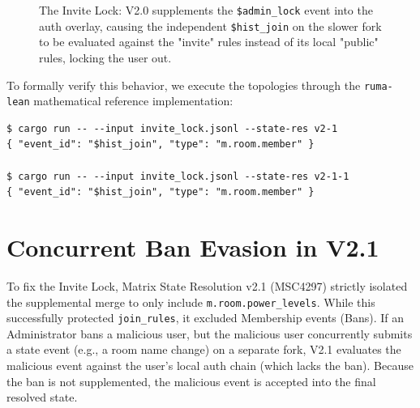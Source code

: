\documentclass[12pt]{article}
\begin{document}
\begin{figure}[H]
\centering
{}
\caption{The Invite Lock: V2.0 supplements the \texttt{\$admin\_lock} event into the auth overlay, causing the independent \texttt{\$hist\_join} on the slower fork to be evaluated against the "invite" rules instead of its local "public" rules, locking the user out.}
\label{fig:invite_lock}
\end{figure}

To formally verify this behavior, we execute the topologies through the \texttt{ruma-lean} mathematical reference implementation:
\begin{lstlisting}[basicstyle=\ttfamily\footnotesize, frame=single, caption={ruma-lean Validation: Invite Lock}]
$ cargo run -- --input invite_lock.jsonl --state-res v2-1
{ "event_id": "$hist_join", "type": "m.room.member" }

$ cargo run -- --input invite_lock.jsonl --state-res v2-1-1
{ "event_id": "$hist_join", "type": "m.room.member" }
\end{lstlisting}

\section{Concurrent Ban Evasion in V2.1}
To fix the Invite Lock, Matrix State Resolution v2.1 (MSC4297) strictly isolated the supplemental merge to only include \texttt{m.room.power\_levels}. While this successfully protected \texttt{join\_rules}, it excluded Membership events (Bans).
If an Administrator bans a malicious user, but the malicious user concurrently submits a state event (e.g., a room name change) on a separate fork, V2.1 evaluates the malicious event against the user's local auth chain (which lacks the ban). Because the ban is not supplemented, the malicious event is accepted into the final resolved state.
\end{document}
